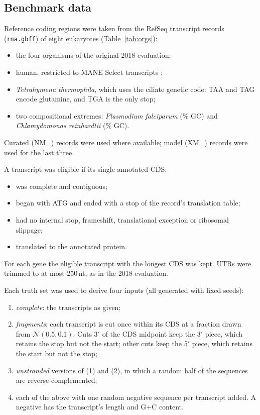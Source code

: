 \subsection{Benchmark data}
Reference coding regions were taken from the RefSeq \citep{OLeary2016} transcript records (\texttt{rna.gbff}) of eight
eukaryotes (Table~\ref{tab:orgs}):
\begin{itemize}
  \item the four organisms of the original 2018 evaluation;
  \item human, restricted to MANE Select transcripts \citep{Morales2022};
  \item \emph{Tetrahymena thermophila}, which uses the ciliate genetic code: TAA and TAG encode
        glutamine, and TGA is the only stop;
  \item two compositional extremes: \emph{Plasmodium falciparum} (\% GC) and
        \emph{Chlamydomonas reinhardtii} (\% GC).
\end{itemize}
Curated (NM\_) records were used where available; model (XM\_) records were used for the last three.

A transcript was eligible if its single annotated CDS:
\begin{itemize}
  \item was complete and contiguous;
  \item began with ATG and ended with a stop of the record's translation table;
  \item had no internal stop, frameshift, translational exception or ribosomal slippage;
  \item translated to the annotated protein.
\end{itemize}
For each gene the eligible transcript with the longest CDS was kept. UTRs were trimmed to at most
250\,nt, as in the 2018 evaluation.

Each truth set was used to derive four inputs (all generated with fixed seeds):
\begin{enumerate}
  \item \emph{complete}: the transcripts as given;
  \item \emph{fragments}: each transcript is cut once within its CDS at a fraction drawn from
        $\mathcal N(0.5,0.1)$. Cuts 3$'$ of the CDS midpoint keep the 3$'$ piece, which retains the
        stop but not the start; other cuts keep the 5$'$ piece, which retains the start but not the
        stop;
  \item \emph{unstranded} versions of (1) and (2), in which a random half of the sequences are
        reverse-complemented;
  \item each of the above with one random negative sequence per transcript added. A negative has
        the transcript's length and G+C content.
\end{enumerate}

